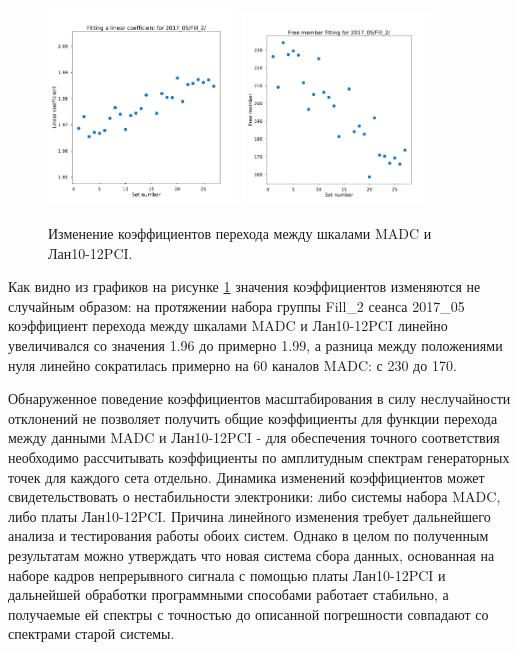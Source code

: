 \documentclass[a4paper,14pt]{extreport}
\begin{document}
\begin{figure}
  \centering
  \includegraphics[width = 0.45\textwidth]{img/testing/linear_coeff_dynamic.pdf}
  \includegraphics[width = 0.44\textwidth]{img/testing/free_coeff_dynamic.pdf}
    \caption{Изменение коэффициентов перехода между шкалами MADC и Лан10-12PCI.}
    \label{fig:testing-coeff-dynamic}
\end{figure}

Как видно из графиков на рисунке \ref{fig:testing-coeff-dynamic} значения коэффициентов изменяются не случайным образом: на протяжении набора группы Fill\_2 сеанса 2017\_05 коэффициент перехода между шкалами MADC и Лан10-12PCI линейно увеличивался со значения 1.96 до примерно 1.99, а разница между положениями нуля линейно сократилась примерно на 60 каналов MADC: с 230 до 170.

Обнаруженное поведение коэффициентов масштабирования в силу неслучайности отклонений не позволяет получить общие коэффициенты для функции перехода между данными MADC и Лан10-12PCI - для обеспечения точного соответствия необходимо рассчитывать коэффициенты по амплитудным спектрам генераторных точек для каждого сета отдельно. Динамика изменений коэффициентов может свидетельствовать о нестабильности электроники: либо системы набора MADC, либо платы Лан10-12PCI. Причина линейного изменения требует дальнейшего анализа и тестирования работы обоих систем. Однако в целом по полученным результатам можно утверждать что новая система сбора данных, основанная на наборе кадров непрерывного сигнала с помощью платы Лан10-12PCI и дальнейшей обработки программными способами работает стабильно, а получаемые ей спектры с точностью до описанной погрешности совпадают со спектрами старой системы.
\end{document}
